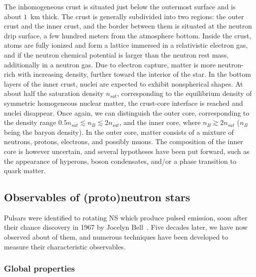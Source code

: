 The inhomogeneous crust is situated just below the outermost surface and is 
about $1$~km thick. 
The crust is generally subdivided into two regions: the outer crust and the 
inner crust, and the border between them is situated at the neutron drip 
surface, a few hundred meters from the atmosphere bottom.
Inside the crust, atoms are fully ionized and form a lattice immersed in a
relativistic electron gas, and if the neutron chemical potential is larger than 
the neutron rest mass, additionally in a neutron gas. 
Due to electron capture, matter is more neutron-rich with increasing density, 
further toward the interior of the star.
In the bottom layers of the inner crust, nuclei are expected to exhibit 
nonspherical shapes.
At about half the saturation density $n_{sat}$, corresponding to the 
equilibrium density of symmetric homogeneous nuclear matter, the crust-core
interface is reached and nuclei disappear. Once again, we can distinguish the
outer core, corresponding to the density range $0.5n_{sat} \lesssim n_B 
\lesssim 2n_{sat}$, and the inner core, where $n_B \gtrsim 2n_{sat}$ ($n_B$
being the baryon density). 
In the outer core, matter consists of a mixture of neutrons, protons, 
electrons, and possibly muons. The composition of the inner core is however 
uncertain, and several hypotheses have been put forward, such as the appearance 
of hyperons, boson condensates, and/or a phase transition to quark 
matter.

\subsection*{Observables of (proto)neutron stars}

Pulsars were identified to rotating NS which produce pulsed emission, soon 
after their chance discovery in 1967 by Jocelyn Bell~\cite{Hewish1968}. Five
decades later, we have now observed about  of them, and numerous 
techniques have been developed to measure their characteristic observables. 

\subsubsection*{Global properties}

